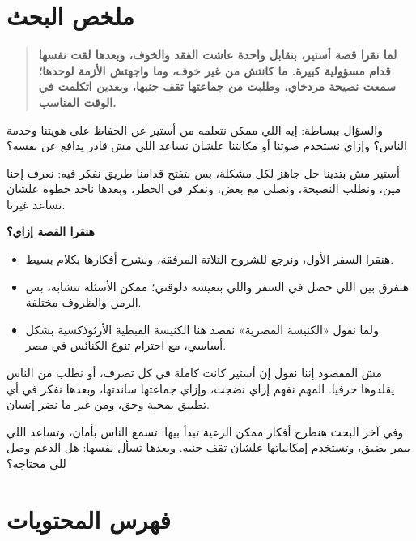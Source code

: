 \documentclass[12pt,a4paper]{article}
\begin{document}
\section*{ملخص البحث}
\begin{quote}\colorbox{soft}{\parbox{0.94\linewidth}{\textbf{لما نقرا قصة أستير، بنقابل واحدة عاشت الفقد والخوف، وبعدها لقت نفسها قدام مسؤولية كبيرة. ما كانتش من غير خوف، وما واجهتش الأزمة لوحدها؛ سمعت نصيحة مردخاي، وطلبت من جماعتها تقف جنبها، وبعدين اتكلمت في الوقت المناسب.}}}\end{quote}
والسؤال ببساطة: إيه اللي ممكن نتعلمه من أستير عن الحفاظ على هويتنا وخدمة الناس؟ وإزاي نستخدم صوتنا أو مكانتنا علشان نساعد اللي مش قادر يدافع عن نفسه؟\par\medskip
أستير مش بتدينا حل جاهز لكل مشكلة، بس بتفتح قدامنا طريق نفكر فيه: نعرف إحنا مين، ونطلب النصيحة، ونصلي مع بعض، ونفكر في الخطر، وبعدها ناخد خطوة علشان نساعد غيرنا.\par\medskip
\vspace{0.2em}\noindent\textcolor{ochre}{\textbf{هنقرا القصة إزاي؟}}\par\smallskip
\begin{itemize}[rightmargin=1.2em,leftmargin=0.5em,itemsep=0.25em,topsep=0.2em]
\item هنقرا السفر الأول، ونرجع للشروح التلاتة المرفقة، ونشرح أفكارها بكلام بسيط.
\item هنفرق بين اللي حصل في السفر واللي بنعيشه دلوقتي؛ ممكن الأسئلة تتشابه، بس الزمن والظروف مختلفة.
\item ولما نقول «الكنيسة المصرية» نقصد هنا الكنيسة القبطية الأرثوذكسية بشكل أساسي، مع احترام تنوع الكنائس في مصر.
\end{itemize}\medskip
مش المقصود إننا نقول إن أستير كانت كاملة في كل تصرف، أو نطلب من الناس يقلدوها حرفيا. المهم نفهم إزاي نضجت، وإزاي جماعتها ساندتها، وبعدها نفكر في أي تطبيق بمحبة وحق، ومن غير ما نضر إنسان.\par\medskip
وفي آخر البحث هنطرح أفكار ممكن الرعية تبدأ بيها: تسمع الناس بأمان، وتساعد اللي بيمر بضيق، وتستخدم إمكانياتها علشان تقف جنبه. وبعدها تسأل نفسها: هل الدعم وصل للي محتاجه؟\par\medskip
\clearpage
\clearpage
\section*{فهرس المحتويات}
\tableofcontents
\clearpage
\clearpage
\end{document}

